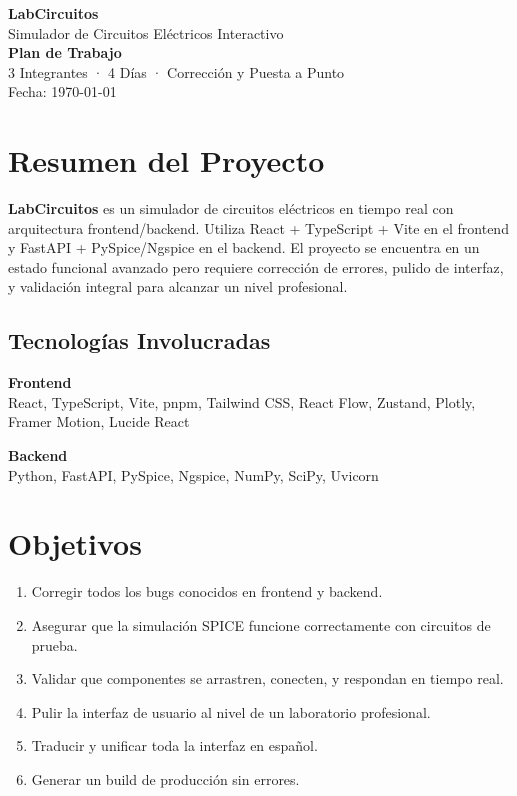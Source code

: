 \documentclass[12pt,a4paper]{article}
\begin{document}
\begin{titlepage}
    \centering
    \vspace*{3cm}
    {\Huge\bfseries\color{primary} LabCircuitos\\[0.5em]}
    {\Large Simulador de Circuitos Eléctricos Interactivo\\[2cm]}
    {\large\textbf{Plan de Trabajo}}\\[1cm]
    {\large 3 Integrantes · 4 Días · Corrección y Puesta a Punto}\\[2cm]
    \vfill
    {\large Fecha: \today}
\end{titlepage}

\section{Resumen del Proyecto}

\textbf{LabCircuitos} es un simulador de circuitos eléctricos en tiempo real con arquitectura frontend/backend. Utiliza React + TypeScript + Vite en el frontend y FastAPI + PySpice/Ngspice en el backend. El proyecto se encuentra en un estado funcional avanzado pero requiere corrección de errores, pulido de interfaz, y validación integral para alcanzar un nivel profesional.

\subsection*{Tecnologías Involucradas}
\begin{minipage}[t]{0.48\textwidth}
    \textbf{Frontend}\\
    React, TypeScript, Vite, pnpm, Tailwind CSS, React Flow, Zustand, Plotly, Framer Motion, Lucide React
\end{minipage}
\hfill
\begin{minipage}[t]{0.48\textwidth}
    \textbf{Backend}\\
    Python, FastAPI, PySpice, Ngspice, NumPy, SciPy, Uvicorn
\end{minipage}

\section{Objetivos}

\begin{enumerate}[label=\arabic*.]
    \item Corregir todos los bugs conocidos en frontend y backend.
    \item Asegurar que la simulación SPICE funcione correctamente con circuitos de prueba.
    \item Validar que componentes se arrastren, conecten, y respondan en tiempo real.
    \item Pulir la interfaz de usuario al nivel de un laboratorio profesional.
    \item Traducir y unificar toda la interfaz en español.
    \item Generar un build de producción sin errores.
\end{enumerate}
\end{document}
